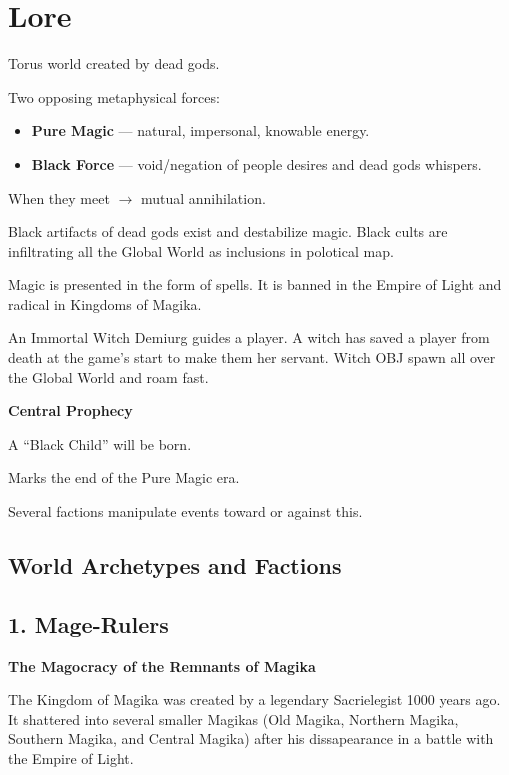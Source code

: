 \documentclass[a4paper,12pt]{article}
\begin{document}
\newpage

\section{Lore}

Torus world created by dead gods.

Two opposing metaphysical forces:

\begin{itemize}
\item \textbf{Pure Magic} — natural, impersonal, knowable energy.
\item \textbf{Black Force} — void/negation of people desires and dead gods whispers.
\end{itemize}

When they meet $\rightarrow$ mutual annihilation.

Black artifacts of dead gods exist and destabilize magic. Black cults are infiltrating all the Global World as inclusions in polotical map. 

Magic is presented in the form of spells. It is banned in the Empire of Light and radical in Kingdoms of Magika.

An Immortal Witch Demiurg guides a player. A witch has saved a player from death at the game's start to make them her servant. Witch OBJ spawn all over the Global World and roam fast.

\textbf{Central Prophecy}

A ``Black Child'' will be born.

Marks the end of the Pure Magic era.

Several factions manipulate events toward or against this.



\subsection{World Archetypes and Factions}

\subsection{1. Mage-Rulers}

\textbf{The Magocracy of the Remnants of Magika}

The Kingdom of Magika was created by a legendary Sacrielegist 1000 years ago. It shattered into several smaller Magikas (Old Magika, Northern Magika, Southern Magika, and Central Magika) after his dissapearance in a battle with the Empire of Light.
\end{document}

